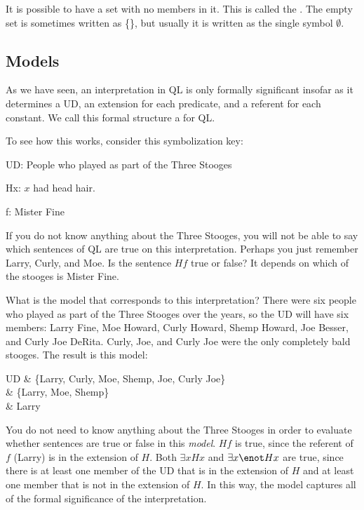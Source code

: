 It is possible to have a set with no members in it. This is called the . The empty set is sometimes written as \{\}, but usually it is written as the single symbol $\emptyset$.

\subsection{Models}
As we have seen, an interpretation in QL is only formally significant insofar as it determines a UD, an extension for each predicate, and a referent for each constant. We call this formal structure a  for QL.

To see how this works, consider this symbolization key:
\begin{ekey}
\item[UD:]People who played as part of the Three Stooges
\item[Hx:]$x$ had head hair.
\item[f:] Mister Fine
\end{ekey}
If you do not know anything about the Three Stooges, you will not be able to say which sentences of QL are true on this interpretation. Perhaps you just remember Larry, Curly, and Moe. Is the sentence $Hf$ true or false? It depends on which of the stooges is Mister Fine.



What is the model that corresponds to this interpretation? There were six people who played as part of the Three Stooges over the years, so the UD will have six members: Larry Fine, Moe Howard, Curly Howard, Shemp Howard, Joe Besser, and Curly Joe DeRita. Curly, Joe, and Curly Joe were the only completely bald stooges. The result is this model:
\begin{partialmodel}
	UD & \{Larry, Curly, Moe, Shemp, Joe, Curly Joe\}\\
	 & \{Larry, Moe, Shemp\}\\
	 & Larry
\end{partialmodel}

You do not need to know anything about the Three Stooges in order to evaluate whether sentences are true or false in this \emph{model}. $Hf$ is true, since the referent of $f$ (Larry) is in the extension of $H$. Both $\exists x Hx$ and $\exists x \enot Hx$ are true, since there is at least one member of the UD that is in the extension of $H$ and at least one member that is not in the extension of $H$. In this way, the model captures all of the formal significance of the interpretation.

